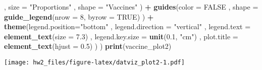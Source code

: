 \documentclass[]{article}
\newenvironment{Shaded}{\begin{snugshade}}{\end{snugshade}}
\newcommand{\DataTypeTok}[1]{\textcolor[rgb]{0.13,0.29,0.53}{#1}}
\newcommand{\DecValTok}[1]{\textcolor[rgb]{0.00,0.00,0.81}{#1}}
\newcommand{\FloatTok}[1]{\textcolor[rgb]{0.00,0.00,0.81}{#1}}
\newcommand{\KeywordTok}[1]{\textcolor[rgb]{0.13,0.29,0.53}{\textbf{#1}}}
\newcommand{\NormalTok}[1]{#1}
\newcommand{\OperatorTok}[1]{\textcolor[rgb]{0.81,0.36,0.00}{\textbf{#1}}}
\newcommand{\OtherTok}[1]{\textcolor[rgb]{0.56,0.35,0.01}{#1}}
\newcommand{\StringTok}[1]{\textcolor[rgb]{0.31,0.60,0.02}{#1}}
\begin{document}
\begin{Shaded}
\begin{Highlighting}[]
\NormalTok{        , }\DataTypeTok{size =} \StringTok{"Proportions"}
\NormalTok{        , }\DataTypeTok{shape =} \StringTok{"Vaccines"}
\NormalTok{    )}
    \OperatorTok{+}\StringTok{ }\KeywordTok{guides}\NormalTok{(}\DataTypeTok{color =} \OtherTok{FALSE}
\NormalTok{        , }\DataTypeTok{shape =} \KeywordTok{guide_legend}\NormalTok{(}\DataTypeTok{nrow =} \DecValTok{8}\NormalTok{, }\DataTypeTok{byrow =} \OtherTok{TRUE}\NormalTok{)}
\NormalTok{    )}
    \OperatorTok{+}\StringTok{ }\KeywordTok{theme}\NormalTok{(}\DataTypeTok{legend.position=}\StringTok{"bottom"}
\NormalTok{        , }\DataTypeTok{legend.direction =} \StringTok{"vertical"}
\NormalTok{        , }\DataTypeTok{legend.text =} \KeywordTok{element_text}\NormalTok{(}\DataTypeTok{size =} \FloatTok{7.3}\NormalTok{)}
\NormalTok{        , }\DataTypeTok{legend.key.size =} \KeywordTok{unit}\NormalTok{(}\FloatTok{0.1}\NormalTok{, }\StringTok{"cm"}\NormalTok{)}
\NormalTok{        , }\DataTypeTok{plot.title =} \KeywordTok{element_text}\NormalTok{(}\DataTypeTok{hjust =} \FloatTok{0.5}\NormalTok{)}
\NormalTok{    )}
\NormalTok{)}
\KeywordTok{print}\NormalTok{(vaccine_plot2)}
\end{Highlighting}
\end{Shaded}

\texttt{[image: hw2\_files/figure-latex/datviz\_plot2-1.pdf]}
\end{document}
